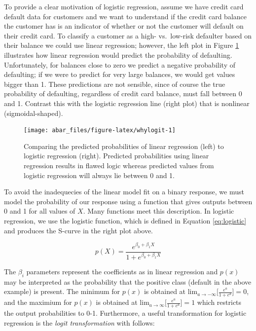 \documentclass[]{book}
\theoremstyle{definition}
\theoremstyle{definition}
\theoremstyle{definition}
\theoremstyle{remark}
\begin{document}
To provide a clear motivation of logistic regression, assume we have
credit card default data for customers and we want to understand if the
credit card balance the customer has is an indicator of whether or not
the customer will default on their credit card. To classify a customer
as a high- vs.~low-risk defaulter based on their balance we could use
linear regression; however, the left plot in Figure \ref{fig:whylogit}
illustrates how linear regression would predict the probability of
defaulting. Unfortunately, for balances close to zero we predict a
negative probability of defaulting; if we were to predict for very large
balances, we would get values bigger than 1. These predictions are not
sensible, since of course the true probability of defaulting, regardless
of credit card balance, must fall between 0 and 1. Contrast this with
the logistic regression line (right plot) that is nonlinear
(sigmoidal-shaped).

\begin{figure}

{\centering \texttt{[image: abar\_files/figure-latex/whylogit-1]} 

}

\caption{Comparing the predicted probabilities of linear regression (left) to logistic regression (right). Predicted probabilities using linear regression results in flawed logic whereas predicted values from logistic regression will always lie between 0 and 1.}\label{fig:whylogit}
\end{figure}

To avoid the inadequecies of the linear model fit on a binary response,
we must model the probability of our response using a function that
gives outputs between 0 and 1 for all values of \(X\). Many functions
meet this description. In logistic regression, we use the logistic
function, which is defined in Equation \eqref{eq:logistic} and produces
the S-curve in the right plot above.

\begin{equation}
\label{eq:logistic}
  p(X) = \frac{e^{\beta_0 + \beta_1X}}{1 + e^{\beta_0 + \beta_1X}}
\end{equation}

The \(\beta_i\) parameters represent the coefficients as in linear
regression and \(p(x)\) may be interpreted as the probability that the
positive class (default in the above example) is present. The minimum
for \(p(x)\) is obtained at
\(\text{lim}_{a \rightarrow -\infty} \big[ \frac{e^a}{1+e^a} \big] = 0\),
and the maximium for \(p(x)\) is obtained at
\(\text{lim}_{a \rightarrow \infty} \big[ \frac{e^a}{1+e^a} \big] = 1\)
which restricts the output probabilities to 0-1. Furthermore, a useful
transformation for logistic regression is the \emph{logit
transformation} with follows:
\end{document}
